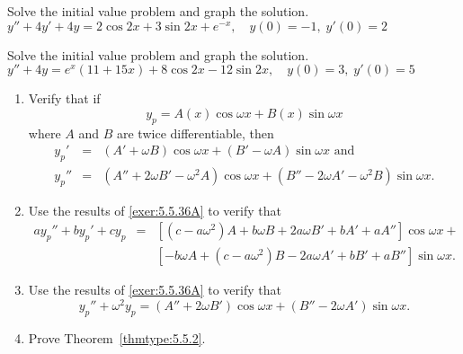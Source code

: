 \documentclass{ximera}
\begin{document}
\begin{problem}\label{exer:5.5.34} 
Solve the initial value problem and graph the solution. $y''+4y'+4y=2\cos2x+3\sin2x+e^{-x} , \quad   y(0)=-1,\;  y'(0)=2$
\end{problem}

\begin{problem}\label{exer:5.5.35} 
Solve the initial value problem and graph the solution. $y''+4y=e^x(11+15x)+8\cos2x-12\sin2x , \quad   y(0)=3,\;  y'(0)=5$
\end{problem}

\begin{problem}\label{exer:5.5.36}
\begin{enumerate}
\item\label{exer:5.5.36A} %
Verify that if
$$
y_p=A(x)\cos\omega x+B(x)\sin\omega x
$$
where $A$ and $B$ are twice differentiable, then
\begin{eqnarray*}
 y_p'&=&(A'+\omega B)\cos\omega x+(B'-\omega A)
\sin\omega x \text{ and}\\
 y_p''&=&(A''+2\omega B'-\omega^2A)\cos\omega x
+(B''-2\omega A'-\omega^2B)\sin\omega x.
\end{eqnarray*}
\item\label{exer:5.5.36B} %
Use the results of \ref{exer:5.5.36A} to verify that
\begin{eqnarray*}
ay_p''+by_p'+cy_p&=&\left[(c-a\omega^2)A+b\omega B+2a\omega
B'+bA'+aA''\right] \cos\omega x+\\  &&
\left[-b\omega A+(c-a\omega^2)B-2a\omega A'+bB'+aB''\right]\sin\omega
x.
\end{eqnarray*}
\item\label{exer:5.5.36C} %
Use the results of \ref{exer:5.5.36A} to verify that
$$
y_p''+\omega^2 y_p=(A''+2\omega B')\cos\omega x+
(B''-2\omega A')\sin\omega x.
$$
\item %
Prove Theorem~\ref{thmtype:5.5.2}.
\end{enumerate}
\end{problem}
\end{document}

